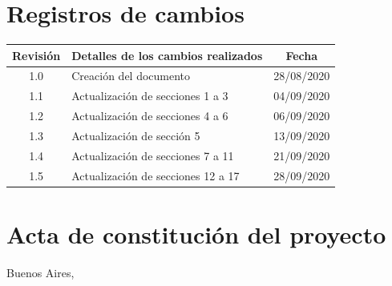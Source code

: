 \documentclass[11pt]{charter}
\begin{document}
\maketitle
\thispagestyle{empty}
\pagebreak


\thispagestyle{empty}
{\setlength{\parskip}{0pt}
\tableofcontents{}
}
\pagebreak


\section{Registros de cambios}
\label{sec:registro}


\begin{table}[ht]
\label{tab:registro}
\centering
\begin{tabularx}{\linewidth}{@{}|c|X|c|@{}}
\hline
\rowcolor[HTML]{C0C0C0} 
Revisión & \multicolumn{1}{c|}{\cellcolor[HTML]{C0C0C0}Detalles de los cambios realizados} & Fecha      \\ \hline
1.0      & Creación del documento                                          & 28/08/2020 \\ \hline
1.1      &  Actualización de secciones 1 a 3                           & 04/09/2020 \\ \hline
1.2      & Actualización de secciones 4 a 6                            & 06/09/2020 \\ \hline
1.3      & Actualización de sección 5                            & 13/09/2020 \\ \hline
1.4      & Actualización de secciones 7 a 11                            & 21/09/2020 \\ \hline
1.5      & Actualización de secciones 12 a 17                           & 28/09/2020 \\ \hline

\end{tabularx}
\end{table}

\pagebreak



\section{Acta de constitución del proyecto}
\label{sec:acta}

\begin{flushright}
Buenos Aires, \fechaInicioName
\end{flushright}

\vspace{2cm}
\end{document}
